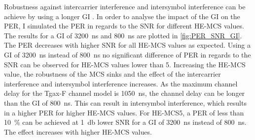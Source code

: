 Robustness against intercarrier interference and intersymbol interference can be achieve by using a longer \ac{GI} \cite{pulimamidi_development_2007}. In order to analyse the impact of the \ac{GI} on the \ac{PER},
I simulated the \ac{PER} in regards to the \ac{SNR} for different HE-MCS values. The results for a \ac{GI} of \SI{3200}{\nano\second} and \SI{800}{\nano\second} are plotted in \autoref{fig:PER_SNR_GI}.
The \ac{PER} decreases with higher \ac{SNR} for all HE-MCS values as expected. Using a \ac{GI} of \SI{3200}{\nano\second} instead of \SI{800}{\nano\second} no significant difference of \ac{PER} in regards to the \ac{SNR} can be observed for HE-\ac{MCS} values lower than \num{5}.
Increasing the HE-\ac{MCS} value, the robustness of the \ac{MCS} sinks and the effect of the intercarrier interference and intersymbol interference increases.
As the maximum channel delay for the Tgax-F channel model is \SI{1050}{\nano\second}, the channel delay can be longer than the \ac{GI} of \SI{800}{\nano\second}. This
can result in intersymbol interference, which results in a higher \ac{PER} for higher HE-\ac{MCS} values.
For HE-\ac{MCS}\num{5}, a \ac{PER} of less than \SI{10}{\percent} can be achieved at \SI{1}{\decibel} lower \ac{SNR} for a \ac{GI} of \SI{3200}{\nano\second} instead of \SI{800}{\nano\second}. The effect increases
with higher HE-\ac{MCS} values.


